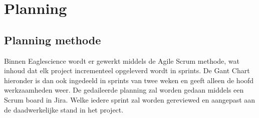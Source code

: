 
\chapter{Planning}\label{ch:planning} %

\label{planning} %

\section{Planning methode}\label{sec:planning-methode}
Binnen Eaglescience wordt er gewerkt middels de Agile Scrum methode, wat inhoud dat elk project incrementeel opgeleverd wordt in sprints.
De Gant Chart hieronder is dan ook ingedeeld in sprints van twee weken en geeft alleen de hoofd werkzaamheden weer.
De gedaileerde planning zal worden gedaan middels een Scrum board in Jira.
Welke iedere sprint zal worden gereviewed en aangepast aan de daadwerkelijke stand in het project.

